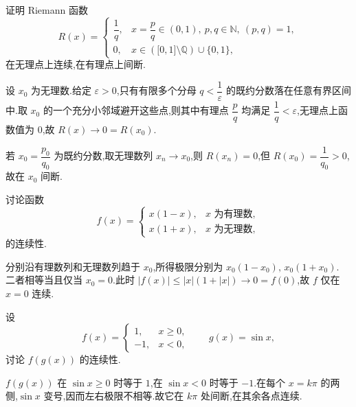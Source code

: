 \begin{example}[\markstar]
    证明 Riemann 函数
     \[
        R(x)=
        \begin{cases}
            \dfrac{1}{q}, & x=\dfrac{p}{q}\in(0,1),\ p,q\in\mathbb{N},\ (p,q)=1, \\
            0,            & x\in\left(\lbrack0,1\rbrack\setminus\mathbb{Q}\right)\cup\{0,1\},
        \end{cases}
    \]
    在无理点上连续,在有理点上间断.
\end{example}
\exampleblank

\begin{solution}
    设 $x_0$ 为无理数.给定 $\varepsilon>0$,只有有限多个分母 $q<\dfrac{1}{\varepsilon}$ 的既约分数落在任意有界区间中.取 $x_0$ 的一个充分小邻域避开这些点,则其中有理点 $\dfrac{p}{q}$ 均满足 $\dfrac{1}{q}<\varepsilon$,无理点上函数值为 $0$,故 $R(x)\to0=R(x_0)$.

    若 $x_0=\dfrac{p_0}{q_0}$ 为既约分数,取无理数列 $x_n\to x_0$,则 $R(x_n)=0$,但 $R(x_0)=\dfrac{1}{q_0}>0$,故在 $x_0$ 间断.
\end{solution}

\begin{example}
    讨论函数
    \[
        f(x)= \begin{cases} x(1-x), & x\text{ 为有理数}, \\ x(1+x), & x\text{ 为无理数}, \end{cases}
    \]
    的连续性.
\end{example}
\exampleblank

\begin{solution}
    分别沿有理数列和无理数列趋于 $x_0$,所得极限分别为 $x_0(1-x_0),\,x_0(1+x_0)$.
    二者相等当且仅当 $x_0=0$.此时 $|f(x)|\leq |x|(1+|x|)\to0=f(0)$,故 $f$ 仅在 $x=0$ 连续.
\end{solution}

\begin{example}
    设
    \[
        f(x)= \begin{cases} 1,  & x\geq0, \\ -1, & x<0, \end{cases} \qquad g(x)=\sin x,
    \]
    讨论 $f(g(x))$ 的连续性.
\end{example}
\exampleblank

\begin{solution}
    $f(g(x))$ 在 $\sin x\geq0$ 时等于 $1$,在 $\sin x<0$ 时等于 $-1$.在每个 $x=k\pi$ 的两侧,$\sin x$ 变号,因而左右极限不相等.故它在 $k\pi$ 处间断,在其余各点连续.
\end{solution}

